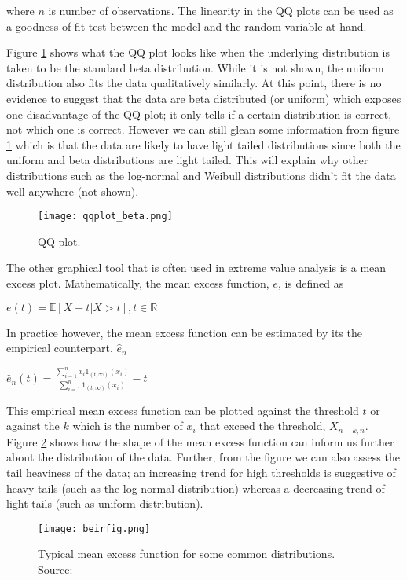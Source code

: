 \noindent where $n$ is number of observations. The linearity in the QQ plots can be used as a goodness of fit test between the model and the random variable at hand.

Figure \ref{fig:beta} shows what the QQ plot looks like when the underlying distribution is taken to be the standard beta distribution. While it is not shown, the uniform distribution also fits the data qualitatively similarly. At this point, there is no evidence to suggest that the data are beta distributed (or uniform) which exposes one disadvantage of the QQ plot; it only tells if a certain distribution is correct, not which one is correct. However we can still glean some information from figure \ref{fig:beta} which is that the data are likely to have light tailed distributions since both the uniform and beta distributions are light tailed. This will explain why other distributions such as the log-normal and Weibull distributions didn't fit the data well anywhere (not shown). 

\begin{figure}
\centering
\texttt{[image: qqplot\_beta.png]}
\caption{\label{fig:beta} QQ plot.}
\end{figure}

The other graphical tool that is often used in extreme value analysis is a mean excess plot. Mathematically, the mean excess function, $e$,  is defined as

\centerline{$e(t) = \mathbb{E}[X-t | X>t], t \in \mathbb{R}$} 
 
In practice however, the mean excess function can be estimated by its the empirical counterpart, $\hat{e}_n$ \citep[ch.~1]{beirlant}

\centerline{$\hat{e}_n(t) = \frac{\sum\limits_{i=1}^n x_i 1_{(t,\infty)}(x_i)}{\sum\limits_{i=1}^n 1_{(t,\infty)}(x_i)} - t$}

This empirical mean excess function can be plotted against the threshold $t$ or against the $k$ which is the number of $x_i$ that exceed the threshold, $X_{n-k,n}$. Figure \ref{fig:beir} shows how the shape of the mean excess function can inform us further about the distribution of the data. Further, from the figure we can also assess the tail heaviness of the data; an increasing trend for high thresholds is suggestive of heavy tails (such as the log-normal distribution) whereas a decreasing trend of light tails (such as uniform distribution).

\begin{figure}
\centering
\texttt{[image: beirfig.png]}
\caption{Typical mean excess function for some common distributions. Source: \cite{beirlant}}
\label{fig:beir} 
\end{figure}

